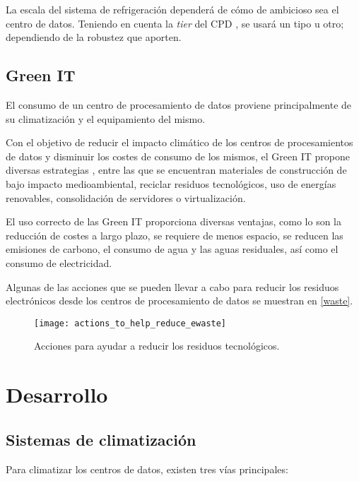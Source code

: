 La escala del sistema de refrigeración dependerá de cómo de ambicioso sea el centro de datos. Teniendo en cuenta la \textit{tier} del CPD \cite{cofrico}, se usará un tipo u otro; dependiendo de la robustez que aporten.

\section{Green IT}

El consumo de un centro de procesamiento de datos proviene principalmente de su climatización y el equipamiento del mismo.

Con el objetivo de reducir el impacto climático de los centros de procesamientos de datos y disminuir los costes de consumo de los mismos, el Green IT propone diversas estrategias \cite{techtargetgreen}, entre las que se encuentran materiales de construcción de bajo impacto medioambiental, reciclar residuos tecnológicos, uso de energías renovables, consolidación de servidores o virtualización.

El uso correcto de las Green IT proporciona diversas ventajas, como lo son la reducción de costes a largo plazo, se requiere de menos espacio, se reducen las emisiones de carbono, el consumo de agua y las aguas residuales, así como el consumo de electricidad.

Algunas de las acciones que se pueden llevar a cabo para reducir los residuos electrónicos desde los centros de procesamiento de datos se muestran en \eqref{waste}.

\begin{figure}
    \begin{center}
        \label{waste}
        \texttt{[image: actions\_to\_help\_reduce\_ewaste]}
        \caption{Acciones para ayudar a reducir los residuos tecnológicos.}
    \end{center}
\end{figure}


\chapter{Desarrollo}

\section{Sistemas de climatización}

Para climatizar los centros de datos, existen tres vías principales:

